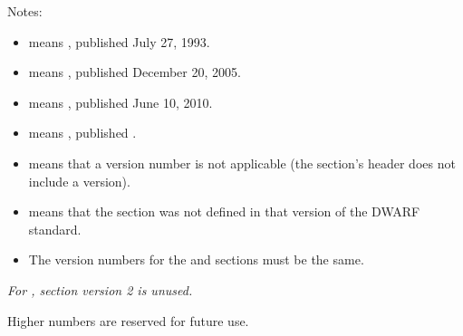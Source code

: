 Notes:

\begin{itemize}
\item  {} means , published July 27, 1993.
\item  {} means , published December 20, 2005.
\item  {} means , published June 10, 2010.
\item  {} means , published 
			.
\item  \doublequote{-} means that a version number is not applicable
(the section's header does not include a version).

\item  {} means that the section was not defined in that
version of the DWARF standard.

\item  The version numbers for the \dotdebuginfo{} and \dotdebugtypes{}
sections must be the same.

\end{itemize}

\textit{For \dotdebugframe{}, section version 2 is unused.}

Higher numbers are reserved for future use.

